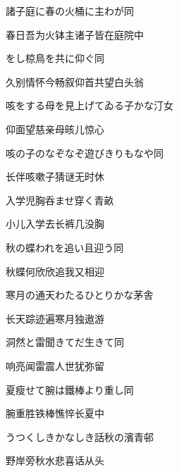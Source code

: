 \begin{haiku}
    {\FH 諸子庭に春の火桶に主わが}\hfill{\FH 同}

    {\FK 春日吾为火钵主诸子皆在庭院中}
\end{haiku}

\begin{haiku}
    {\FH {}をし椋鳥を共に仰ぐ}\hfill{\FH 同}

    {\FK 久别情怀今畅叙仰首共望白头翁}
\end{haiku}

\begin{haiku}
    {\FH 咳をする母を見上げてゐる子かな}\hfill{\FH 汀女}

    {\FK 仰面望慈亲母晐儿惊心}
\end{haiku}

\begin{haiku}
    {\FH 咳の子のなぞなぞ遊びきりもなや}\hfill{\FH 同}

    {\FK 长伴咳嗽子猜谜无时休}
\end{haiku}

\begin{haiku}
    {\FH 入学児胸呑ませ穿く}\hfill{\FH 青畝}

    {\FK 小儿入学去长裤几没胸}
\end{haiku}

\begin{haiku}
    {\FH 秋の蝶われを追い且迎う}\hfill{\FH 同}

    {\FK 秋蝶何欣欣追我又相迎}
\end{haiku}

\begin{haiku}
    {\FH 寒月の通天わたるひとりかな}\hfill{\FH 茅舎}

    {\FK 长天踪迹遍寒月独遨游}
\end{haiku}

\begin{haiku}
    {\FH 洞然と雷聞きてだ生きて}\hfill{\FH 同}

    {\FK 响亮闻雷震人世犹弥留}
\end{haiku}

\begin{haiku}
    {\FH 夏瘦せて腕は鐵棒より重し}\hfill{\FH 同}

    {\FK 腕重胜铁棒憔悴长夏中}
\end{haiku}

\begin{haiku}
    {\FH うつくしきかなしき話秋の濱}\hfill{\FH 青邨}

    {\FK 野岸旁秋水悲喜话从头}
\end{haiku}

